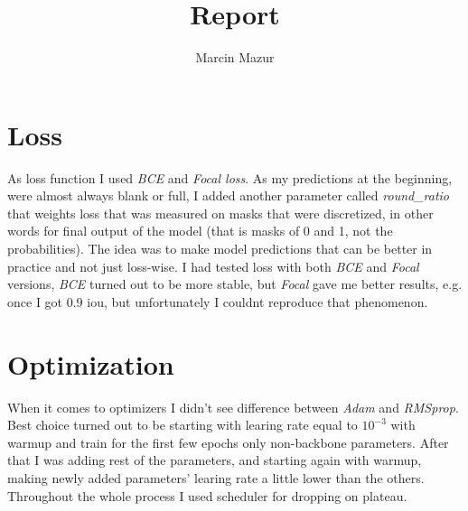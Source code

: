 \documentclass[a4paper]{article}
\title{Report}
\author{Marcin Mazur}
\begin{document}
\maketitle

\section{Loss}
As loss function I used \textit{BCE} and \textit{Focal loss}. As my predictions at the beginning,
were almost always blank or full, I added another parameter called \textit{round\_ratio} that
weights loss that was measured on masks that were discretized, in other words for final output
of the model (that is masks of 0 and 1, not the probabilities). The idea was to make model
predictions that can be better in practice and not just loss-wise. I had tested loss with both
\textit{BCE} and \textit{Focal} versions, \textit{BCE} turned out to be more stable, but \textit{Focal}
gave me better results, e.g. once I got $0.9$ iou, but unfortunately I couldnt reproduce that phenomenon.

\section{Optimization}
When it comes to optimizers I didn't see difference between \textit{Adam} and \textit{RMSprop}.
Best choice turned out to be starting with learing rate equal to $10^{-3}$ with warmup and train for the first
few epochs only non-backbone parameters. After that I was adding rest of the parameters, and starting again
with warmup, making newly added parameters' learing rate a little lower than the others. Throughout the whole process
I used scheduler for dropping on plateau.
\end{document}
